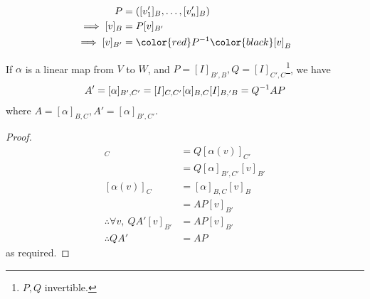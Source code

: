     \begin{warning} ~\vspace*{-1.5\baselineskip}
        \begin{align*}
            P &= ([v_1']_B, \dots, [v_n']_B) \\
            \implies [v]_B &= P [v]_{B'} \\
            \implies [v]_{B'} &= \color{red}P\inv\color{black} [v]_B
        \end{align*} 
    \end{warning} 
    \begin{proposition}
        If $\alpha$ is a linear map from $V$ to $W$, and $P = [I]_{B',B}, Q = [I]_{C',C}$\footnote{$P, Q$ invertible.}, we have
        \begin{align*}
            A' = [\alpha]_{B',C'} = [I]_{C,C'}[\alpha]_{B,C}[I]_{B,'B} = Q^{-1} AP
        \end{align*}
        where $A = [\alpha]_{B,C}, A' = [\alpha]_{B',C'}$.
    \end{proposition}
    \begin{proof}
        \begin{align*}
            [\alpha(v)]_C & = Q [\alpha(v)]_{C'} \\
            &= Q [\alpha]_{B',C'} [v]_{B'} \\
            [\alpha(v)]_C &= [\alpha]_{B,C} [v]_B \\
            &= AP[v]_{B'} \\
            \therefore \forall v,\ QA'[v]_{B'} &= AP[v]_{B'} \\
            \therefore QA' &= AP
        \end{align*}
        as required.
    \end{proof}

